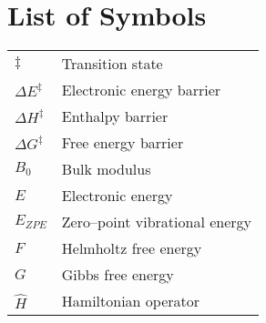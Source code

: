\chapter{List of Symbols}

\vspace{-0.5cm}

\begin{longtable}{p{} p{}}
\hline
${\ddagger}$ & Transition state\\
$ \Delta E^{\ddagger}$ &  Electronic energy barrier\\
$ \Delta H^{\ddagger}$ &  Enthalpy barrier\\
$ \Delta G^{\ddagger}$ &  Free energy barrier\\ 
$ B_0 $ & Bulk modulus\\
$ E $ & Electronic energy\\
$ E_{ZPE}$ & Zero--point vibrational energy \\
$ F $ & Helmholtz free energy\\
$ G $ & Gibbs free energy\\
$\hat{H}$ & Hamiltonian operator\\

\end{longtable}
